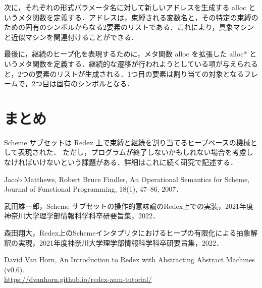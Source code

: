 \documentclass[twocolumn]{jsarticle}
\begin{document}
次に，それぞれの形式パラメータ名に対して新しいアドレスを生成する alloc というメタ関数を定義する．アドレスは，束縛される変数名と，その特定の束縛のための固有のシンボルからなる2要素のリストである．これにより，具象マシンと近似マシンを関連付けることができる．

最後に，継続のヒープ化を表現するために，メタ関数 alloc を拡張した alloc* というメタ関数を定義する．継続的な遷移が行われようとしている項が与えられると，2つの要素のリストが生成される．1つ目の要素は割り当ての対象となるフレームで，2つ目は固有のシンボルとなる．

\section{まとめ}
Scheme サブセットは Redex 上で束縛と継続を割り当てるヒープベースの機械として表現された．
ただし，プログラムが終了しないかもしれない場合を考慮しなければいけないという課題がある．詳細はこれに続く研究\cite{racket-ref3}で記述する．

\begin{thebibliography}{99}

 Jacob Matthews, Robert Bruce Findler, An Operational Semantics for Scheme, Journal of Functional Programming, 18(1), 47--86, 2007．

 武田雄一郎，Scheme サブセットの操作的意味論のRedex上での実装，2021年度神奈川大学理学部情報科学科卒研要旨集，2022．

 森田翔大，Redex上のSchemeインタプリタにおけるヒープの有限化による抽象解釈の実現，2021年度神奈川大学理学部情報科学科卒研要旨集，2022．

 David Van Horn, An Introduction to Redex with Abstracting Abstract Machines (v0.6).\\ \url{https://dvanhorn.github.io/redex-aam-tutorial/}

\end{thebibliography}
\end{document}
